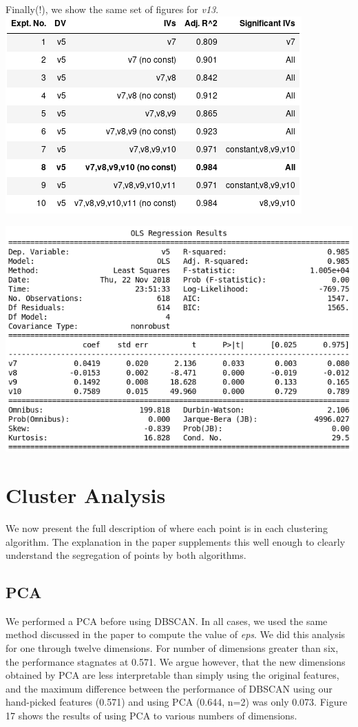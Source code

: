 \documentclass[12pt,a4paper]{article}
\begin{document}
Finally(!), we show the same set of figures for \textit{v13}.\\

\includegraphics[scale=0.5]{v5_sub_reg.png}
\begingroup
{}
\endgroup
\hfill\break

\includegraphics[scale=0.5]{v5_sub_exp.png}
\begingroup
{}
\endgroup

\section{Cluster Analysis}
We now present the full description of where each point is in each clustering algorithm. The explanation in the paper supplements this well enough to clearly understand the segregation of points by both algorithms.

\subsection{PCA}
We performed a PCA before using DBSCAN. In all cases, we used the same method discussed in the paper to compute the value of \textit{eps}. We did this analysis for one through twelve dimensions. For number of dimensions greater than six, the performance stagnates at 0.571. We argue however, that the new dimensions obtained by PCA are less interpretable than simply using the original features, and the maximum difference between the performance of DBSCAN using our hand-picked features (0.571) and using PCA (0.644, n=2) was only 0.073. Figure 17 shows the results of using PCA to various numbers of dimensions.
\end{document}
